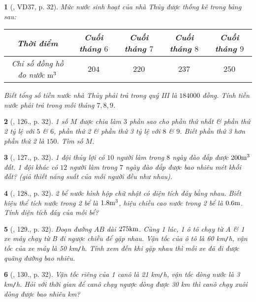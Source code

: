 \documentclass{article}
\newtheorem{baitoan}{}
\begin{document}
\begin{baitoan}[\cite{Tuyen_Toan_7}, VD37, p. 32]
	Mức nước sinh hoạt của nhà Thủy được thống kê trong bảng sau:	
	\begin{table}[H]
		\centering
		\begin{tabular}{|c|c|c|c|c|}
			\hline
			Thời điểm & Cuối tháng $6$ & Cuối tháng $7$ & Cuối tháng $8$ & Cuối tháng $9$ \\
			\hline
			Chỉ số đồng hồ đo nước $\rm m^3$ & $204$ & $220$ & $237$ & $250$ \\
			\hline
		\end{tabular}
	\end{table}
	\noindent Biết tổng số tiền nước nhà Thủy phải trả trong quý III là $184000$ đồng. Tính tiền nước phải trả trong mỗi tháng $7,8,9$.
\end{baitoan}

\begin{baitoan}[\cite{Tuyen_Toan_7}, 126., p. 32]
	1 số $M$ được chia làm $3$ phần sao cho phần thứ nhất \& phần thứ 2 tỷ lệ với $5$ \& $6$, phần thứ 2 \& phần thứ 3 tỷ lệ với $8$ \& $9$. Biết phần thứ 3 hơn phần thứ 2 là $150$. Tìm số $M$.
\end{baitoan}

\begin{baitoan}[\cite{Tuyen_Toan_7}, 127., p. 32]
	1 đội thủy lợi có $10$ người làm trong $8$ ngày đào đắp được $\rm200m^3$ đất. 1 đội khác có $12$ người làm trong $7$ ngày đào đắp được bao nhiêu mét khối đất? (giả thiết năng suất của mỗi người đều như nhau).
\end{baitoan}

\begin{baitoan}[\cite{Tuyen_Toan_7}, 128., p. 32]
	2 bể nước hình hộp chữ nhật có diện tích đáy bằng nhau. Biết hiệu thể tích nước trong 2 bể là $\rm1.8m^3$, hiệu chiều cao nước trong 2 bể là $\rm0.6m$. Tính diện tích đáy của mỗi bể?
\end{baitoan}

\begin{baitoan}[\cite{Tuyen_Toan_7}, 129., p. 32]
	Đoạn đường $AB$ dài $\rm275km$. Cùng 1 lúc, 1 ô tô chạy từ A \& 1 xe máy chạy từ B đi ngược chiều để gặp nhau. Vận tốc của ô tô là {\rm60 km{\tt/}h}, vận tốc của xe máy là {\rm50 km{\tt/}h}. Tính xem đến khi gặp nhau thì mỗi xe đã đi được quãng đường bao nhiêu.
\end{baitoan}

\begin{baitoan}[\cite{Tuyen_Toan_7}, 130., p. 32]
	Vận tốc riêng của 1 canô là {\rm21 km{\tt/}h}, vận tốc dòng nước là {\rm3 km{\tt/}h}. Hỏi với thời gian để canô chạy ngược dòng được {\rm30 km} thì canô chạy xuôi dòng được bao nhiêu {\rm km}?
\end{baitoan}
\end{document}
